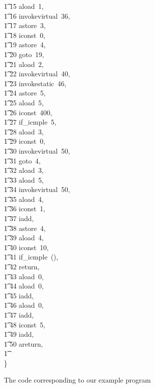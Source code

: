 \begin{figure}[p]
\begin{vwcol}[widths={0.7,0.3},rule=none]
\begin{axdef}
        \t1 15 \mapsto aload~1, \\
        \t1 16 \mapsto invokevirtual~36, \\
        \t1 17 \mapsto astore~3, \\
        \t1 18 \mapsto iconst~0, \\
        \t1 19 \mapsto astore~4, \\
        \t1 20 \mapsto goto~19, \\
        \t1 21 \mapsto aload~2, \\
        \t1 22 \mapsto invokevirtual~40, \\
        \t1 23 \mapsto invokestatic~46, \\
        \t1 24 \mapsto astore~5, \\
        \t1 25 \mapsto aload~5, \\
        \t1 26 \mapsto iconst~400, \\
        \t1 27 \mapsto if\_icmple~5, \\
        \t1 28 \mapsto aload~3, \\
        \t1 29 \mapsto iconst~0, \\
        \t1 30 \mapsto invokevirtual~50, \\
        \t1 31 \mapsto goto~4, \\
        \t1 32 \mapsto aload~3, \\
        \t1 33 \mapsto aload~5, \\
        \t1 34 \mapsto invokevirtual~50, \\
        \t1 35 \mapsto aload~4, \\
        \t1 36 \mapsto iconst~1, \\
        \t1 37 \mapsto iadd, \\
        \t1 38 \mapsto astore~4, \\
        \t1 39 \mapsto aload~4, \\
        \t1 40 \mapsto iconst~10, \\
        \t1 41 \mapsto if\_icmple~(), \\
        \t1 42 \mapsto return, \\
        \t1 43 \mapsto aload~0, \\
        \t1 44 \mapsto aload~0, \\
        \t1 45 \mapsto iadd, \\
        \t1 46 \mapsto aload~0, \\
        \t1 47 \mapsto iadd, \\
        \t1 48 \mapsto iconst~5, \\
        \t1 49 \mapsto iadd, \\
        \t1 50 \mapsto areturn, \\
        \t1 {} \cdots {} \\
        \}
      \end{axdef}
      \vspace{0.1cm}
  \end{vwcol}
  \caption{The \Circus{} code corresponding to our example program}
  \label{example-model-figure}
\end{figure}%
